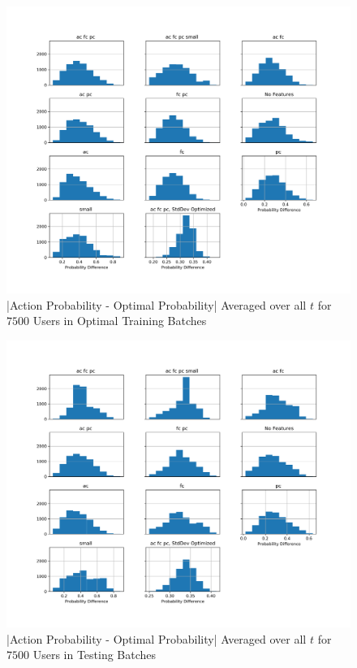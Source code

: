 	\begin{figure}[H]
	\includegraphics[width=1.5\textwidth,center]{figures/QM5train.png}%
	\caption{|Action Probability - Optimal Probability| Averaged over all $t$ for $7500$ Users in Optimal Training Batches}
	\label{QM5train}
	\end{figure}

	\begin{figure}[H]
	\includegraphics[width=1.5\textwidth,center]{figures/QM5test.png}%
	\caption{|Action Probability - Optimal Probability| Averaged over all $t$ for $7500$ Users in Testing Batches}
	\label{QM5test}
	\end{figure}

